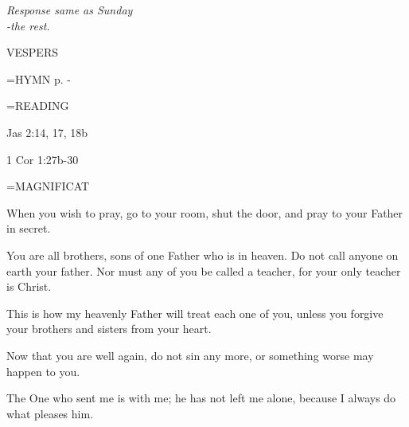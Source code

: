 \begin{center}
\textit{Response same as Sunday\\
-the rest.}
\end{center}

\begin{flushleft}\normalsize VESPERS\\\end{flushleft}

\hangindent=\parindent \small{\uppercase{HYMN} p. \pageref{lent:firstHymn}-\pageref{lent:lastHymn}\\}

\hangindent=\parindent \small READING
\begin{description}[labelindent=\parindent, leftmargin=*]
\item [Weeks 1-4:]     Jas 2:14, 17, 18b \textbf{\\}
\item [Week 5:]     1 Cor 1:27b-30 \textbf{    \\}
\end{description}

\hangindent=\parindent \small MAGNIFICAT
\begin{description}[labelindent=\parindent, leftmargin=*]
\item [Week 1:] 	When you wish to pray, go to your room, shut the door, and pray to your Father in secret.
\item [Week 2:] 	You are all brothers, sons of one Father who is in heaven. Do not call anyone on earth your father. Nor must any of you be called a teacher, for your only teacher is Christ.
\item [Week 3:] 	This is how my heavenly Father will treat each one of you, unless you forgive your brothers and sisters from your heart.
\item [Week 4:] 	Now that you are well again, do not sin any more, or something worse may happen to you.
\item [Week 5:] 	The One who sent me is with me; he has not left me alone, because I always do what pleases him.
\end{description}
